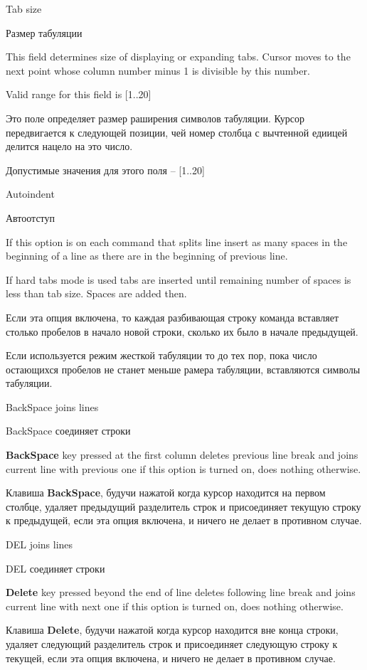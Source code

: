 \begin{popup}
\ifenglish
\caption{Tab size}
\else
\caption{Размер табуляции}
\fi
{}
\ifenglish
This field determines size of displaying or expanding tabs. Cursor moves to the
next point whose column number minus 1 is divisible by this number.

Valid range for this field is [1..20]

\else
Это поле определяет размер раширения символов табуляции. Курсор передвигается к
следующей позиции, чей номер столбца с вычтенной едиицей делится нацело на это
число.

Допустимые значения для этого поля -- [1..20]
\fi
\end{popup}

\begin{popup}
\ifenglish
\caption{Autoindent}
\else
\caption{Автоотступ}
\fi
{}
\ifenglish
If this option is on each command that splits line insert as many spaces in the
beginning of a line as there are in the beginning of previous line.

If hard tabs mode is used tabs are inserted until remaining number of spaces is
less than tab size. Spaces are added then.

\else
Если эта опция включена, то каждая разбивающая строку команда вставляет столько
пробелов в начало новой строки, сколько их было в начале предыдущей.

Если используется режим жесткой табуляции то до тех пор, пока число остающихся
пробелов не станет меньше рамера табуляции, вставляются символы табуляции.
\fi
\end{popup}

\begin{popup}
\ifenglish
\caption{BackSpace joins lines}
\else
\caption{BackSpace соединяет строки}
\fi
{}

\ifenglish
{\bf BackSpace} key pressed at the first column deletes previous line break
and joins current line with previous one if this option is turned on, does nothing
otherwise.

\else
Клавиша {\bf BackSpace}, будучи нажатой когда курсор находится на первом столбце,
удаляет предыдущий разделитель строк и присоединяет текущую строку к предыдущей,
если эта опция включена, и ничего не делает в противном случае.
\fi
\end{popup}

\begin{popup}
\ifenglish
\caption{DEL joins lines}
\else
\caption{DEL соединяет строки}
\fi
{}
\ifenglish
{\bf Delete} key pressed beyond the end of line deletes following line break
and joins current line with next one if this option is turned on, does nothing
otherwise.

\else
Клавиша {\bf Delete}, будучи нажатой когда курсор находится вне конца строки,
удаляет следующий разделитель строк и присоединяет следующую строку к текущей,
если эта опция включена, и ничего не делает в противном случае.
\fi
\end{popup}

